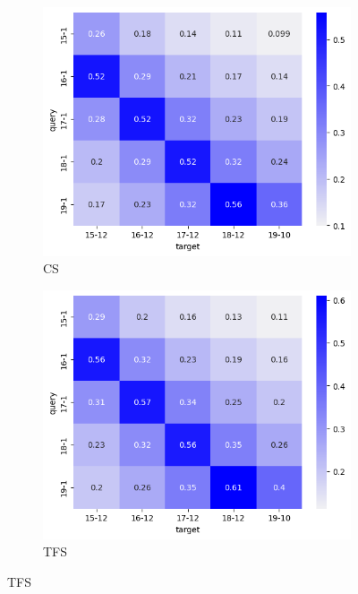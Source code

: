 \begin{figure}[ht]
    \centering
    \begin{subfigure}{0.48\linewidth}
    \includegraphics[width=\linewidth]{stylometryExtensions/figures/heat/os.png}
    \caption{CS}
    \label{fig:tempral_vary:os}
    \end{subfigure}
    \begin{subfigure}{0.48\linewidth}
    \includegraphics[width=\linewidth]{stylometryExtensions/figures/heat/tfs.png}
    \caption{TFS}
    \label{fig:tempral_vary:tfs}
    \end{subfigure}
    

\end{figure}
